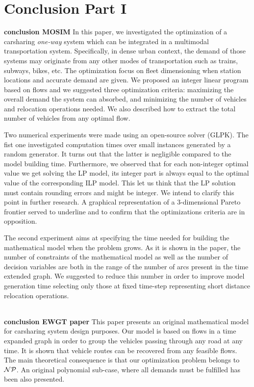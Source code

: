 \chapter*{Conclusion Part I} \label{chap:conclusionPart1}

\textbf{conclusion MOSIM}
In this paper, we investigated the optimization of a carsharing \emph{one-way} system which can be integrated in a multimodal transportation system. Specifically, in dense urban context, the demand of those systems may originate from any other modes of transportation such as trains, subways, bikes, etc. The optimization focus on fleet dimensioning when station locations and accurate demand are given. We proposed an integer linear program based on flows and we suggested three optimization criteria: maximizing the overall demand the system can absorbed, and minimizing the number of vehicles and relocation operations needed. We also described how to extract the total number of vehicles from any optimal flow.

Two numerical experiments were made using an open-source solver (GLPK). The fist one investigated computation times over small instances generated by a random generator. It turns out that the latter is negligible compared to the model building time. Furthermore, we observed that for each non-integer optimal value we get solving the LP model, its integer part is always equal to the optimal value of the corresponding ILP model. This let us think that the LP solution must contain rounding errors and might be integer. We intend to clarify this point in further research. A graphical representation of a 3-dimensional Pareto frontier served to underline and to confirm that the optimizations criteria are in opposition.

The second experiment aims at specifying the time needed for building the mathematical model when the problem grows. As it is shown in the paper, the number of constraints of the mathematical model as well as the number of decision variables are both in the range of the number of arcs present in the time extended graph. We suggested to reduce this number in order to improve model generation time selecting only those at fixed time-step representing short distance relocation operations.

~\\
\textbf{conclusion EWGT paper}
This paper presents an original mathematical model for carsharing system design purposes.
Our model is based on flows in a time expanded graph in order to group the vehicles passing through any road at any time. 
It is shown that vehicle routes can be recovered from any feasible flows.
The main theoretical consequence is that our optimization problem belongs to ${\cal NP}$.
An original polynomial sub-case, where all demands must be fulfilled has been also presented.

